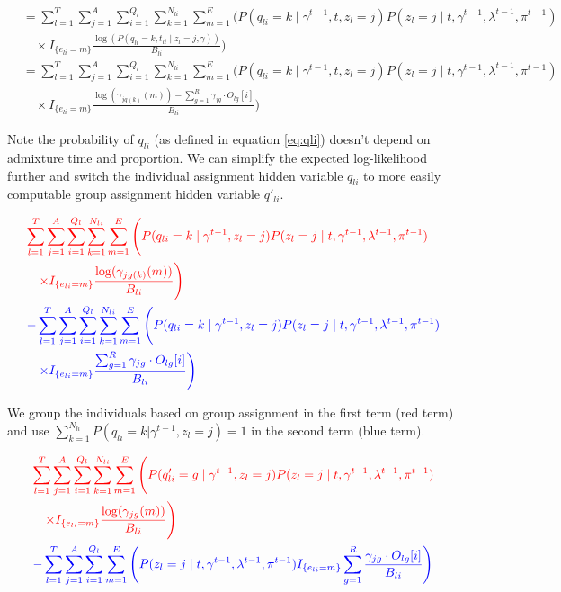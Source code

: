 \begin{align}
    &= \sum_{l = 1}^T \sum_{j = 1}^A \sum_{i = 1}^{Q_l} \sum_{k = 1}^{N_{li}} \sum_{m = 1}^E \Bigg( 
        P(q_{li} = k \mid \gamma^{t-1}, t, z_l = j) P(z_l = j \mid t, \gamma^{t-1}, \lambda^{t-1}, \pi^{t-1}) \nonumber \\
    &\quad \times I_{\{e_{l i} = m\}} \frac{\log(P(q_{l i} = k, t_{li} \mid z_l = j, \gamma))}{B_{li}} \Bigg) \nonumber \\
    &= \sum_{l = 1}^T \sum_{j = 1}^A \sum_{i = 1}^{Q_l} \sum_{k = 1}^{N_{li}} \sum_{m = 1}^E \Bigg( 
        P(q_{li} = k \mid \gamma^{t-1}, t, z_l = j) P(z_l = j \mid t, \gamma^{t-1}, \lambda^{t-1}, \pi^{t-1}) \nonumber \\
    &\quad \times I_{\{e_{l i} = m\}} \frac{\log(\gamma_{jg(k)}(m)) - \sum_{g=1}^R \gamma_{jg} \cdot O_{lg}[i]}{B_{li}} \Bigg) 
\end{align}

Note the probability of $q_{li}$ (as defined in equation \ref{eq:qli}) doesn't depend on admixture time and proportion. We can simplify the expected log-likelihood further and switch the individual assignment hidden variable $q_{li}$ to more easily computable group assignment hidden variable $q'_{li}$. 

\begin{align}
   &\color{red}{\sum_{l = 1}^T \sum_{j = 1}^A \sum_{i = 1}^{Q_l} \sum_{k = 1}^{N_{li}} \sum_{m = 1}^E \Bigg( 
       P(q_{li} = k \mid \gamma^{t-1}, z_l = j) P(z_l = j \mid t, \gamma^{t-1}, \lambda^{t-1}, \pi^{t-1})} \nonumber \\
   &\quad \color{red}{\times I_{\{e_{l i} = m\}} \frac{\log(\gamma_{jg(k)}(m))}{B_{li}} \Bigg)} \nonumber \\
   &\color{blue}{- \sum_{l = 1}^T \sum_{j = 1}^A \sum_{i = 1}^{Q_l} \sum_{k = 1}^{N_{li}} \sum_{m = 1}^E \Bigg( 
       P(q_{li} = k \mid \gamma^{t-1}, z_l = j) P(z_l = j \mid t, \gamma^{t-1}, \lambda^{t-1}, \pi^{t-1})} \nonumber \\
   &\quad \color{blue}{\times I_{\{e_{l i} = m\}} \frac{\sum_{g=1}^R \gamma_{jg} \cdot O_{lg}[i]}{B_{li}} \Bigg)}
\end{align}

We group the individuals based on group assignment in the first term (red term) and use $\sum_{k =1}^{N_{li}} P(q_{li} = k | \gamma^{t-1}, z_l = j) = 1$ in the second term (blue term). 

\begin{align}
   &\color{red}{\sum_{l = 1}^T \sum_{j = 1}^A \sum_{i = 1}^{Q_l} \sum_{k = 1}^{N_{li}} \sum_{m = 1}^E \Bigg( 
       P(q'_{li} = g \mid \gamma^{t-1}, z_l = j) P(z_l = j \mid t, \gamma^{t-1}, \lambda^{t-1}, \pi^{t-1})} \nonumber \\
   &\quad \color{red}{\times I_{\{e_{l i} = m\}} \frac{\log(\gamma_{jg}(m))}{B_{li}} \Bigg)} \nonumber \\
   &\color{blue}{- \sum_{l = 1}^T \sum_{j = 1}^A \sum_{i = 1}^{Q_l} \sum_{m = 1}^E \Bigg( 
       P(z_l = j \mid t, \gamma^{t-1}, \lambda^{t-1}, \pi^{t-1}) I_{\{e_{l i} = m\}}}  \sum_{g=1}^R \frac{\gamma_{jg} \cdot O_{lg}[i]}{B_{li}} \Bigg)
   \label{estep:ell-simple}
\end{align}


